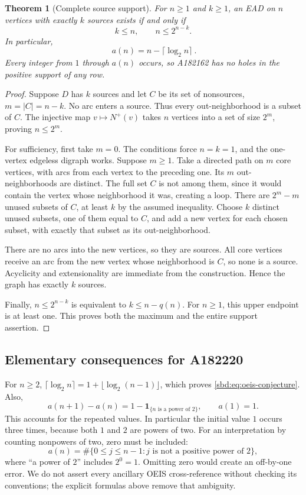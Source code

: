 \documentclass[11pt,a4paper]{article}
\newtheorem{theorem}{Theorem}[section]
\theoremstyle{definition}
\begin{document}
\begin{theorem}[Complete source support]\label{sbd:thm:support}
For $n\ge1$ and $k\ge1$, an EAD on $n$ vertices with exactly $k$ sources
exists if and only if
\begin{equation}\label{sbd:eq:feasible}
 k\le n,\qquad n\le 2^{n-k}.
\end{equation}
In particular,
\begin{equation}\label{sbd:eq:max}
 \boxed{\ a(n)=n-\lceil\log_2n\rceil\ }.
\end{equation}
Every integer from $1$ through $a(n)$ occurs, so A182162 has no holes
in the positive support of any row.
\end{theorem}
\begin{proof}
Suppose $D$ has $k$ sources and let $C$ be its set of nonsources,
$m=|C|=n-k$. No arc enters a source. Thus every out-neighborhood is a
subset of $C$. The injective map $v\mapsto N^+(v)$ takes $n$ vertices
into a set of size $2^m$, proving $n\le2^m$.

For sufficiency, first take $m=0$. The conditions force $n=k=1$,
and the one-vertex edgeless digraph works. Suppose $m\ge1$.
Take a directed path on $m$ core vertices, with arcs from each vertex
to the preceding one. Its $m$ out-neighborhoods are distinct. The full
set $C$ is not among them, since it would contain the vertex whose
neighborhood it was, creating a loop. There are $2^m-m$ unused subsets
of $C$, at least $k$ by the assumed inequality. Choose $k$ distinct
unused subsets, one of them equal to $C$, and add a new vertex for each
chosen subset, with exactly that subset as its out-neighborhood.

There are no arcs into the new vertices, so they are sources. All core
vertices receive an arc from the new vertex whose neighborhood is $C$,
so none is a source. Acyclicity and extensionality are immediate from
the construction. Hence the graph has exactly $k$ sources.

Finally, $n\le2^{n-k}$ is equivalent to $k\le n-q(n)$.
For $n\ge1$, this upper endpoint is at least one. This proves both the
maximum and the entire support assertion.
\end{proof}

\subsection{Elementary consequences for A182220}
For $n\ge2$, $\lceil\log_2n\rceil=1+\lfloor\log_2(n-1)\rfloor$,
which proves \eqref{sbd:eq:oeis-conjecture}. Also,
\begin{equation}\label{sbd:eq:step}
 a(n+1)-a(n)=1-\boldsymbol 1_{\{n\text{ is a power of }2\}},
 \qquad a(1)=1.
\end{equation}
This accounts for the repeated values. In particular the initial value
$1$ occurs three times, because both $1$ and $2$ are powers of two.
For an interpretation by counting nonpowers of two, zero must be included:
\[
 a(n)=\#\{0\le j\le n-1:j\text{ is not a positive power of }2\},
\]
where ``a power of $2$'' includes $2^0=1$. Omitting zero would create an
off-by-one error. We do not assert every ancillary OEIS cross-reference
without checking its conventions; the explicit formulas above remove
that ambiguity.
\end{document}
